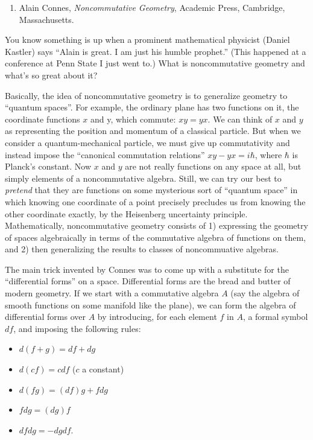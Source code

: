 \documentclass[12pt]{article}
\def\tightlist{}
\begin{document}
\begin{enumerate}
\def\labelenumi{\arabic{enumi})}
\tightlist
\item
   Alain Connes, \emph{Noncommutative Geometry}, Academic Press, Cambridge,
   Massachusetts.
\end{enumerate}

You know something is up when a prominent mathematical physicist (Daniel
Kastler) says ``Alain is great. I am just his humble prophet.'' (This
happened at a conference at Penn State I just went to.) What is
noncommutative geometry and what's so great about it?

Basically, the idea of noncommutative geometry is to generalize geometry
to ``quantum spaces''. For example, the ordinary plane has two functions
on it, the coordinate functions \(x\) and y, which commute: \(xy = yx\).
We can think of \(x\) and \(y\) as representing the position and
momentum of a classical particle. But when we consider a
quantum-mechanical particle, we must give up commutativity and instead
impose the ``canonical commutation relations'' \(xy-yx = i \hbar\),
where \(\hbar\) is Planck's constant. Now \(x\) and \(y\) are not really
functions on any space at all, but simply elements of a noncommutative
algebra. Still, we can try our best to \emph{pretend} that they are
functions on some mysterious sort of ``quantum space'' in which knowing
one coordinate of a point precisely precludes us from knowing the other
coordinate exactly, by the Heisenberg uncertainty principle.
Mathematically, noncommutative geometry consists of 1) expressing the
geometry of spaces algebraically in terms of the commutative algebra of
functions on them, and 2) then generalizing the results to classes of
noncommuative algebras.

The main trick invented by Connes was to come up with a substitute for
the ``differential forms'' on a space. Differential forms are the bread
and butter of modern geometry. If we start with a commutative algebra
\(A\) (say the algebra of smooth functions on some manifold like the
plane), we can form the algebra of differential forms over \(A\) by
introducing, for each element \(f\) in \(A\), a formal symbol \(df\),
and imposing the following rules:

\begin{itemize}
\tightlist
\item
  \(d(f+g) = df + dg\)
\item
  \(d(cf) = c df\) (\(c\) a constant)
\item
  \(d(fg) = (df)g + f dg\)
\item
  \(fdg = (dg)f\)
\item
  \(df dg = -dg df\).
\end{itemize}
\end{document}
